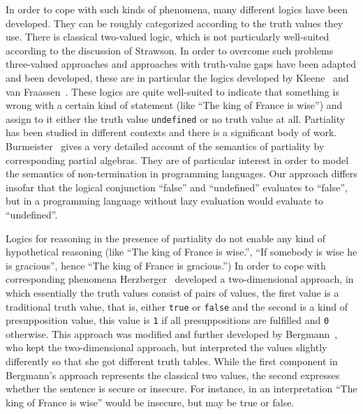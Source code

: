 \documentclass{\filespath jancl}
\def\sf{\tt}
\begin{document}
In order to cope with such kinds of phenomena, many different logics
have been developed.  They can be roughly categorized according to the
truth values they use. There is classical two-valued logic, which is
not particularly well-suited according to the discussion of Strawson.
In order to overcome such problems three-valued approaches and
approaches with truth-value gaps have been adapted and been developed,
these are in particular the logics developed by Kleene~\cite{Kleene52}
and van Fraassen~\cite{Fraassen66}.  These logics are quite
well-suited to indicate that something is wrong with a certain kind of
statement (like ``The king of France is wise'') and assign to it
either the truth value {\sf undefined} or no truth value at
all. Partiality has been studied in different contexts and there is a
significant body of work. Burmeister~\cite{Burmeister86} gives a very
detailed account of the semantics of partiality by
corresponding partial algebras. They are of particular
interest in order to model the semantics of non-termination in
programming languages. Our approach differs insofar that the logical
conjunction ``false'' and ``undefined'' evaluates to ``false'', but in
a programming language without lazy evaluation would evaluate to
``undefined''.

Logics for reasoning in the presence of partiality do not
enable any kind of hypothetical reasoning (like ``The king of France
is wise.'', ``If somebody is wise he is gracious'', hence ``The king
of France is gracious.'')  In order to cope with corresponding
phenomena Herzberger~\cite{Herzberger73} developed a two-dimensional
approach, in which essentially the truth values consist of pairs of
values, the first value is a traditional truth value, that is, either
{\sf true} or {\sf false} and the second is a kind of presupposition
value, this value is {\sf 1} if all presuppositions are fulfilled and
{\sf 0} otherwise.  This approach was modified and further developed
by Bergmann~\cite{Bergmann:patdl81}, who kept the two-dimensional
approach, but interpreted the values slightly differently so that she
got different truth tables.  While the first component in Bergmann's
approach represents the classical two values, the second expresses
whether the sentence is secure or insecure.  For instance, in an
interpretation ``The king of France is wise'' would be insecure, but
may be true or false.
\end{document}
